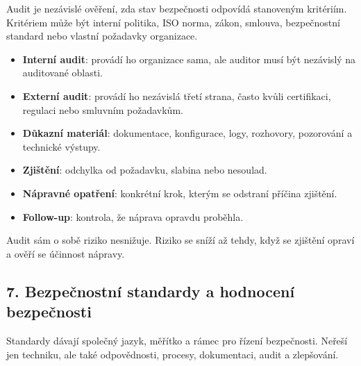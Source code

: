 Audit je nezávislé ověření, zda stav bezpečnosti odpovídá stanoveným kritériím. Kritériem může být interní politika, ISO norma, zákon, smlouva, bezpečnostní standard nebo vlastní požadavky organizace.

\begin{itemize}
    \item \textbf{Interní audit}: provádí ho organizace sama, ale auditor musí být nezávislý na auditované oblasti.
    \item \textbf{Externí audit}: provádí ho nezávislá třetí strana, často kvůli certifikaci, regulaci nebo smluvním požadavkům.
    \item \textbf{Důkazní materiál}: dokumentace, konfigurace, logy, rozhovory, pozorování a technické výstupy.
    \item \textbf{Zjištění}: odchylka od požadavku, slabina nebo nesoulad.
    \item \textbf{Nápravné opatření}: konkrétní krok, kterým se odstraní příčina zjištění.
    \item \textbf{Follow-up}: kontrola, že náprava opravdu proběhla.
\end{itemize}


Audit sám o sobě riziko nesnižuje. Riziko se sníží až tehdy, když se zjištění opraví a ověří se účinnost nápravy.


\subsection*{7. Bezpečnostní standardy a hodnocení bezpečnosti}

Standardy dávají společný jazyk, měřítko a rámec pro řízení bezpečnosti. Neřeší jen techniku, ale také odpovědnosti, procesy, dokumentaci, audit a zlepšování.

